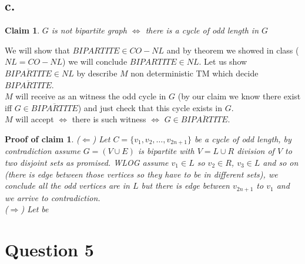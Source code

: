 \documentclass[11pt]{article}
\theoremstyle{plain}
\newtheorem{claim}{Claim}[theorem]
\theoremstyle{nonumberplainnobrackets}
\newtheorem{claimproof}{Proof of claim}
\begin{document}
\subsection*{c. }
\begin{claim}
$G$ is not bipartite graph $\iff$ there is a cycle of odd length in $G$
\end{claim}
We will show that $BIPARTITE \in CO-NL$ and by theorem we showed in class ($NL=CO-NL$) we will conclude $BIPARTITE\in NL$. Let us show $\overline{BIPARTITE}\in NL$ by describe $M$ non deterministic TM which decide $\overline{BIPARTITE}$.\\
$M$ will receive as an witness the odd cycle in $G$ (by our claim we know there exist iff $G\in \overline{BIPARTITE}$) and just check that this cycle exists in $G$.\\
$M$ will accept $\iff$ there is such witness $\iff$ $G \in \overline{BIPARTITE}$.
\begin{claimproof}
($\Leftarrow$) Let $C = \{ v_1,v_2,\ldots,v_{2n+1} \}$ be a cycle of odd length, by contradiction assume $G=(V\cup E)$ is bipartite with $V=L\cup R$ division of $V$ to two disjoint sets as promised. WLOG assume $v_1\in L$ so $v_2\in R$, $v_3\in L$ and so on (there is edge between those vertices so they have to be in different sets), we conclude all the odd vertices are in $L$ but there is edge between $v_{2n+1}$ to $v_1$ and we arrive to contradiction.\\
($\Rightarrow$) Let be 
\end{claimproof}	
\section*{Question 5}
\end{document}
